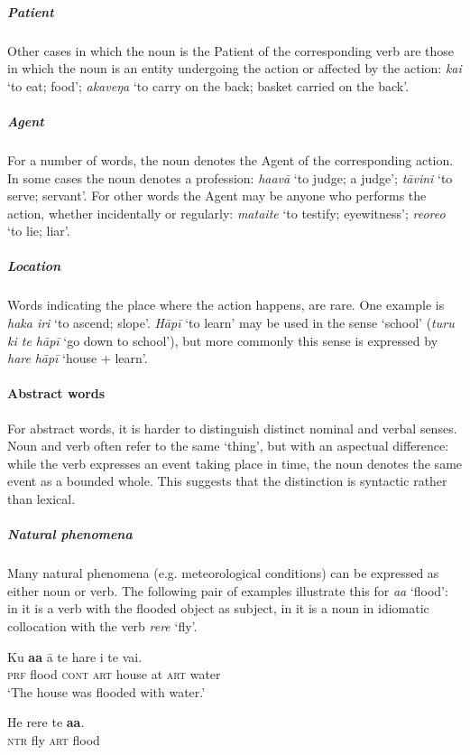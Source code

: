 \subparagraph{Patient} Other cases in which the noun is the Patient of the corresponding verb are those in which the noun is an entity undergoing the action or affected by the action: \textit{kai} ‘to eat; food’; \textit{{\ꞌ}akaveŋa} ‘to carry on the back; basket carried on the back’.

\subparagraph{Agent} For a number of words, the noun denotes the Agent of the corresponding action. In some cases the noun denotes a profession: \textit{ha{\ꞌ}avā} ‘to judge; a judge’; \textit{tāvini} ‘to serve; servant’. For other words the Agent may be anyone who performs the action, whether incidentally or regularly: \textit{mata{\ꞌ}ite} ‘to testify; eyewitness’; \textit{reoreo} ‘to lie; liar’. 

\subparagraph{Location} Words indicating the place where the action happens, are rare. One example is \textit{haka iri} ‘to ascend; slope’. \textit{Hāpī} ‘to learn’ may be used in the sense ‘school’ (\textit{turu ki te hāpī} ‘go down to school’), but more commonly this sense is expressed by \textit{hare} \textit{hāpī} ‘house + learn’. 

\paragraph{Abstract words}\label{sec:3.2.2.1.2} For abstract words, it is harder to distinguish distinct nominal and verbal senses. Noun and verb often refer to the same ‘thing’, but with an aspectual difference: while the verb expresses an event taking place in time, the noun denotes the same event as a bounded whole. This suggests that the distinction is syntactic rather than lexical. 

\subparagraph{Natural phenomena} Many natural phenomena (e.g. meteorological conditions) can be expressed as either noun or verb. The following pair of examples illustrate this for \textit{a{\ꞌ}a} ‘flood’: in  it is a verb with the flooded object as subject, in  it is a noun in idiomatic collocation with the verb \textit{rere} ‘fly’.

\ea\label{ex:3.12}
\gll Ku \textbf{a{\ꞌ}a} {\ꞌ}ā te hare {\ꞌ}i te vai.\\
\textsc{prf} flood \textsc{cont} \textsc{art} house at \textsc{art} water\\

\glt 
‘The house was flooded with water.’ \textstyleExampleref{[Egt]}
\z

\ea\label{ex:3.13}
\gll He rere te \textbf{a{\ꞌ}a}. \\
\textsc{ntr} fly \textsc{art} flood \\

